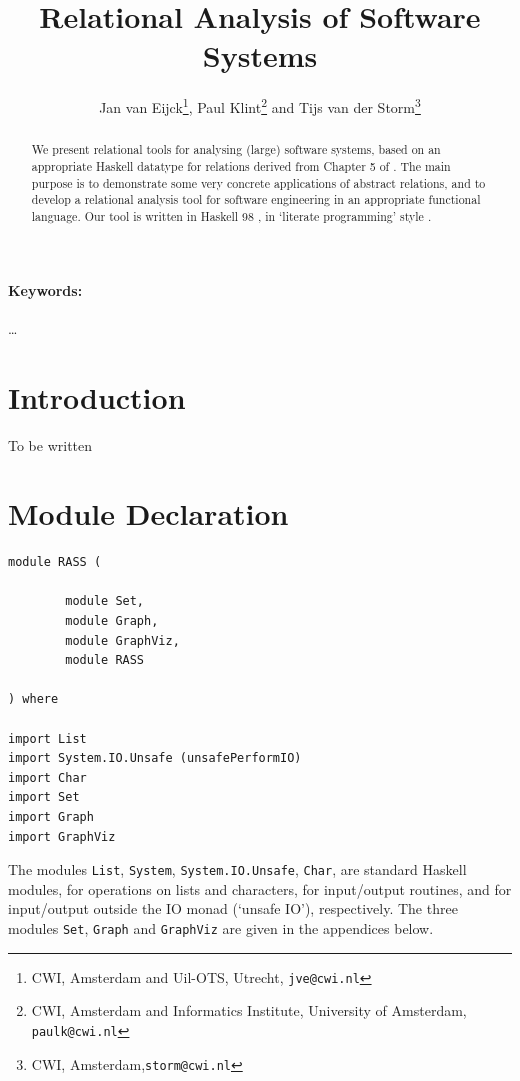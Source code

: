 \documentclass[11pt]{article}
\title{Relational Analysis of Software Systems}
\author{Jan van Eijck\thanks{CWI, Amsterdam
        and Uil-OTS, Utrecht, \texttt{jve@cwi.nl}}, 
        Paul Klint\thanks{CWI, Amsterdam
        and Informatics Institute, University of Amsterdam, \texttt{paulk@cwi.nl}}
        and 
        Tijs van der Storm\thanks{CWI, Amsterdam,\texttt{storm@cwi.nl}}
}
\newlength{\fminilength}
\newenvironment{fminipage}[1][\linewidth]
 {\setlength{\fminilength}{#1-2\fboxsep-2\fboxrule-1em}%
  \bigskip\begin{lrbox}{\fminibox}\quad\begin{minipage}{\fminilength}\bigskip}
 {\smallskip\end{minipage}\end{lrbox}\noindent\fbox{\usebox{\fminibox}}\bigskip}
\newcommand{\bc}{\begin{fminipage}}
\newcommand{\ec}{\end{fminipage}}
\begin{document}
\maketitle 

\begin{abstract} \noindent
We present relational tools for analysing (large) software systems,
based on an appropriate Haskell datatype for relations derived from
Chapter 5 of \cite{DoeEij04:thr}. The main purpose is to demonstrate
some very concrete applications of abstract relations, and to develop 
a relational analysis tool for software engineering in an appropriate 
functional language. Our tool is written in Haskell 98
\cite{Haskell98:rep}, in `literate programming' style \cite{Knuth:lp}.
\end{abstract} 

\paragraph{Keywords:} \ldots


\section{Introduction} 

To be written

\section{Module Declaration} 

\bc\begin{verbatim}
module RASS ( 

        module Set,
        module Graph,
        module GraphViz,
        module RASS

) where 

import List
import System.IO.Unsafe (unsafePerformIO) 
import Char
import Set
import Graph
import GraphViz
\end{verbatim}\ec

The modules \verb^List^,  \verb^System^, \verb^System.IO.Unsafe^, \verb^Char^, 
are standard Haskell modules, for operations on lists and characters, 
for input/output routines, and for input/output outside the IO monad (`unsafe IO'), 
respectively. The three modules \verb^Set^, \verb^Graph^ 
and \verb^GraphViz^ are given in the appendices below. 
\end{document}
